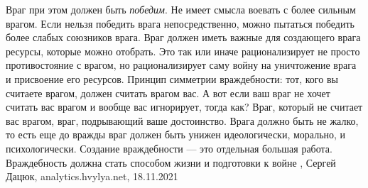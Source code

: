 Враг при этом должен быть \emph{победим}. Не имеет смысла воевать с более сильным
врагом. Если нельзя победить врага непосредственно, можно пытаться победить
более слабых союзников врага.  Враг должен иметь важные для создающего врага
ресурсы, которые можно отобрать.  Это так или иначе рационализирует не просто
противостояние с врагом, но рационализирует саму войну на уничтожение врага и
присвоение его ресурсов.  Принцип симметрии враждебности: тот, кого вы считаете
врагом, должен считать врагом вас. А вот если ваш враг не хочет считать вас
врагом и вообще вас игнорирует, тогда как? Враг, который не считает вас врагом,
враг, подрывающий ваше достоинство.  Врага должно быть не жалко, то есть еще до
вражды враг должен быть унижен идеологически, морально, и психологически.
Создание враждебности — это отдельная большая работа. Враждебность должна стать
способом жизни и подготовки к войне
, Сергей Дацюк, analytics.hvylya.net, 18.11.2021
